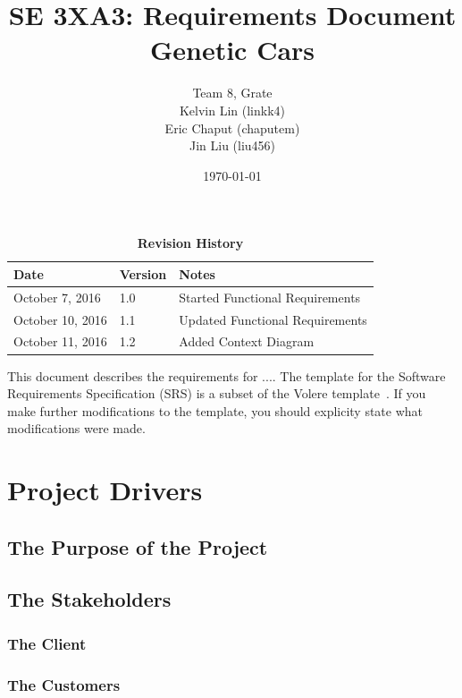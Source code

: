 \documentclass[12pt, titlepage]{article}
\title{SE 3XA3: Requirements Document\\Genetic Cars}
\author{Team 8, Grate
		\\ Kelvin Lin (linkk4)
		\\ Eric Chaput (chaputem)
		\\ Jin Liu (liu456)
}
\date{\today}
\begin{document}
\maketitle

\tableofcontents
\listoftables
\listoffigures

\begin{table}[h]
\caption{\bf Revision History}
\begin{tabularx}{\textwidth}{p{3.5cm}p{2cm}X}
\toprule {\bf Date} & {\bf Version} & {\bf Notes}\\
\midrule
October 7, 2016 & 1.0 & Started Functional Requirements\\
October 10, 2016 & 1.1 & Updated Functional Requirements\\
October 11, 2016 & 1.2 & Added Context Diagram\\
\bottomrule
\end{tabularx}
\end{table}

\newpage


This document describes the requirements for ....  The template for the Software
Requirements Specification (SRS) is a subset of the Volere
template~\citep{RobertsonAndRobertson2012}.  If you make further modifications
to the template, you should explicity state what modifications were made.

\section{Project Drivers}

\subsection{The Purpose of the Project}

\subsection{The Stakeholders}

\subsubsection{The Client}

\subsubsection{The Customers}
\end{document}
